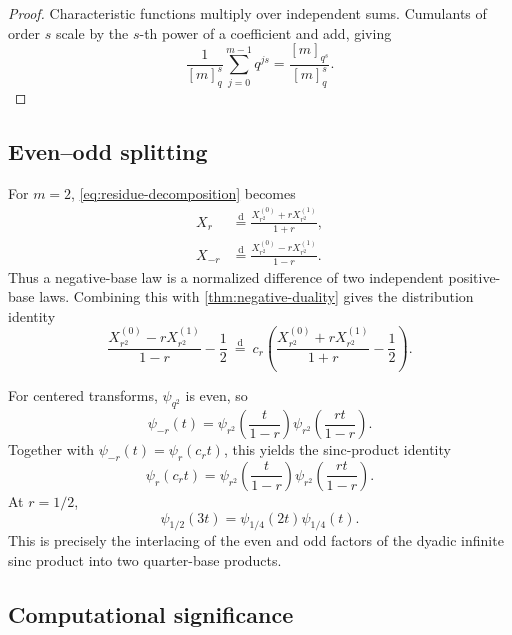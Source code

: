 \documentclass[11pt]{article}
\theoremstyle{definition}
\newcommand{\doteqL}{\mathrel{\stackrel{\mathrm d}=}}
\begin{document}
\begin{proof}
Characteristic functions multiply over independent sums.  Cumulants of order \(s\)
scale by the \(s\)-th power of a coefficient and add, giving
\[
 \frac{1}{[m]_q^s}\sum_{j=0}^{m-1}q^{js}
 =\frac{[m]_{q^s}}{[m]_q^s}.
\]
\end{proof}

\subsection{Even--odd splitting}

For \(m=2\), \cref{eq:residue-decomposition} becomes
\begin{align}
 X_r&\doteqL\frac{X_{r^2}^{(0)}+rX_{r^2}^{(1)}}{1+r},     \label{eq:positive-even-odd}\\
 X_{-r}&\doteqL\frac{X_{r^2}^{(0)}-rX_{r^2}^{(1)}}{1-r}. \label{eq:negative-even-odd}
\end{align}
Thus a negative-base law is a normalized difference of two independent positive-base
laws.  Combining this with \cref{thm:negative-duality} gives the distribution identity
\begin{equation}
 \frac{X_{r^2}^{(0)}-rX_{r^2}^{(1)}}{1-r}-\frac12
 \ \doteqL\
 c_r\left(
 \frac{X_{r^2}^{(0)}+rX_{r^2}^{(1)}}{1+r}-\frac12\right). \label{eq:sum-difference-identity}
\end{equation}

For centered transforms, \(\psi_{q^2}\) is even, so
\begin{equation}
 \psi_{-r}(t)=
 \psi_{r^2}\!\left(\frac{t}{1-r}\right)
 \psi_{r^2}\!\left(\frac{rt}{1-r}\right).                \label{eq:negative-even-odd-char}
\end{equation}
Together with \(\psi_{-r}(t)=\psi_r(c_rt)\), this yields the sinc-product identity
\begin{equation}
 \boxed{
 \psi_r(c_rt)=
 \psi_{r^2}\!\left(\frac{t}{1-r}\right)
 \psi_{r^2}\!\left(\frac{rt}{1-r}\right).}              \label{eq:sinc-splitting}
\end{equation}
At \(r=1/2\),
\begin{equation}
 \boxed{\psi_{1/2}(3t)=\psi_{1/4}(2t)\psi_{1/4}(t).}      \label{eq:dyadic-quarter-product}
\end{equation}
This is precisely the interlacing of the even and odd factors of the dyadic infinite sinc
product into two quarter-base products.

\subsection{Computational significance}
\end{document}
